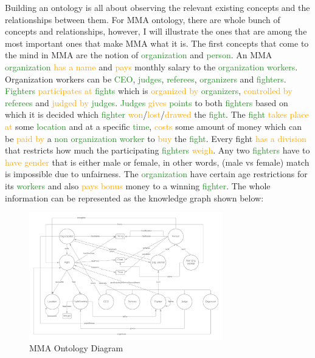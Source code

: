 \documentclass[a4paper]{article}
\begin{document}
Building an ontology is all about observing the relevant existing concepts and the relationships between them. For MMA ontology, there are whole bunch of concepts and relationships, however, 
I will illustrate the ones that are among the most important ones that make MMA what it is. The first concepts that come to the mind in MMA are the notion of 
\textcolor{ForestGreen}{organization} and \textcolor{ForestGreen}{person}. An MMA \textcolor{ForestGreen}{organization} \textcolor{orange}{has a name} and 
\textcolor{orange}{pays} monthly salary to the \textcolor{ForestGreen}{organization workers}. Organization workers can be \textcolor{ForestGreen}{CEO}, \textcolor{ForestGreen}{judges}, 
\textcolor{ForestGreen}{referees}, \textcolor{ForestGreen}{organizers} and \textcolor{ForestGreen}{fighters}. \textcolor{ForestGreen}{Fighters} \textcolor{orange}{participates at} 
\textcolor{ForestGreen}{fights} which is \textcolor{orange}{organized by} \textcolor{ForestGreen}{organizers}, \textcolor{orange}{controlled by} \textcolor{ForestGreen}{referees} and
\textcolor{orange}{judged by} \textcolor{ForestGreen}{judges}. \textcolor{ForestGreen}{Judges} \textcolor{orange}{gives} \textcolor{ForestGreen}{points} to both \textcolor{ForestGreen}{fighters} 
based on which it is decided which \textcolor{ForestGreen}{fighter} \textcolor{orange}{won}/\textcolor{orange}{lost}/\textcolor{orange}{drawed} the \textcolor{ForestGreen}{fight}.
The \textcolor{ForestGreen}{fight} \textcolor{orange}{takes place at} some \textcolor{ForestGreen}{location} and at a specific \textcolor{ForestGreen}{time}, \textcolor{orange}{costs} some 
amount of money which can be \textcolor{orange}{paid by} a \textcolor{ForestGreen}{non organization worker} to \textcolor{orange}{buy} the \textcolor{ForestGreen}{fight}. Every fight 
\textcolor{orange}{has a division} that restricts how much the participating \textcolor{ForestGreen}{fighters} \textcolor{orange}{weigh}. Any two \textcolor{ForestGreen}{fighters} 
have to \textcolor{orange}{have gender} that is either male or female, in other words, (male vs female) match is impossible due to unfairness. The \textcolor{ForestGreen}{organization} 
have certain age restrictions for its \textcolor{ForestGreen}{workers} and also \textcolor{orange}{pays bonus} money to a winning \textcolor{ForestGreen}{fighter}.
The whole information can be represented as the knowledge graph shown below:

\begin{figure}[H]
	\centering
	\includegraphics[width=0.75\textwidth]{resources/mma_onto.png}
	\caption{MMA Ontology Diagram}
	\label{fig:mma_ontology}
\end{figure}
\end{document}
